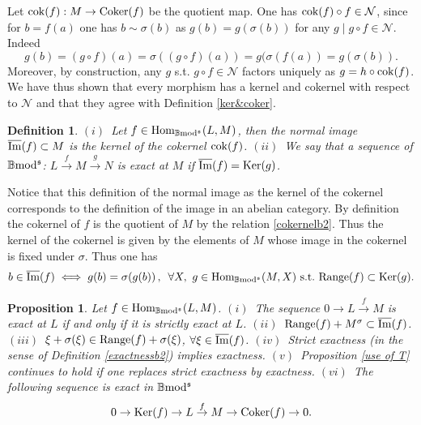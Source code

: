 \documentclass[12pt]{article}
\newtheorem{prop}[thm]{Proposition}
\newtheorem{defn}[thm]{Definition}
\def\Hom{{\rm Hom}}
\def\Ker{{\rm Ker}}
\def\coker{{\rm Coker}}
\def\scoker{{\rm cok}}
\def\B{{\mathbb B}}
\def\imm{\overline{\rm Im}}
\def\strg{strict }
\def\Strg{Strict }
\def\strgly{strictly }
\def\cN{{\mathcal N}}
\def\qqq{\,,\,~\forall}
\def\ker{{\mbox{Ker}}}
\def\Hom {{\mbox{Hom}}}
\def\b2{{\rm \B mod^{\mathfrak s}}}
\begin{document}
 Let $\scoker(f):M\to \coker(f)$ be the quotient map. One has $\scoker(f)\circ f\in \cN$, since for $b=f(a)$ one has $b\sim \sigma(b)$ as $g(b)=g(\sigma(b))$ for any $g\mid g\circ f\in \cN.$ Indeed 
 $$
 g(b)=(g\circ f)(a)=\sigma((g\circ f)(a))=g(\sigma(f(a))=g(\sigma(b)).
 $$
  Moreover, by construction, any $g$ s.t. $g\circ f\in \cN$ factors uniquely as $g=h\circ \scoker(f)$.
  We have thus shown that every morphism has a kernel and cokernel with respect to $\cN$ and that they agree with Definition \ref{ker&coker}.\endproof
  \begin{defn}\label{exactnessb2bis}  $(i)$~Let $f\in \Hom_\b2(L,M)$, then the normal image $\imm(f)\subset M$ is the kernel of the  cokernel $\scoker(f)$.\newline
  $(ii)$~We say that a sequence  of $\b2$: $L\stackrel{f}{\to} M\stackrel{g}{\to}N$ is {\em  exact} at $M$ if $\imm(f)=\ker(g)$.
 \end{defn}
  Notice that this definition of the normal image as the kernel of the cokernel corresponds to the definition of the image in an abelian category. By definition the cokernel of $f$ is the quotient of $M$ by the relation \eqref{cokernelb2}. Thus the kernel of the cokernel is given by the elements of $M$ whose image in the cokernel is fixed under $\sigma$. Thus one has 
  \begin{equation}\label{imagedefn}
 	b\in \imm(f)\iff g(b)=\sigma(g(b))\qqq X, \ g\in \Hom_\b2(M,X)~{\rm s.t.}~ {\rm Range}(f)\subset \ker(g).
 \end{equation}
  \begin{prop}\label{tentative1} Let $f\in\Hom_\b2(L,M)$.\newline
  $(i)$~The sequence $0\to L\stackrel{f}{\to}M$ is exact at $L$ if and only if it is \strgly exact at $L$.\newline
$(ii)$~${\rm Range}(f)+M^\sigma\subset \imm(f)$.\newline
 $(iii)$~$\xi+\sigma(\xi)\in {\rm Range}(f)+\sigma(\xi)$, $\forall \xi\in \imm(f)$.\newline
 $(iv)$~\Strg exactness (in the sense of Definition \ref{exactnessb2}) implies exactness.\newline
 $(v)$~Proposition \ref{use of T} continues to hold if one replaces \strg exactness by exactness.\newline
  $(vi)$~The following sequence is exact in $\b2$ 
 \begin{equation}\label{5exactnice}
 	0 \to \Ker(f)\to L\stackrel{f}{\to}M\to \coker(f)\to 0.
 \end{equation}
\end{prop}
\end{document}
